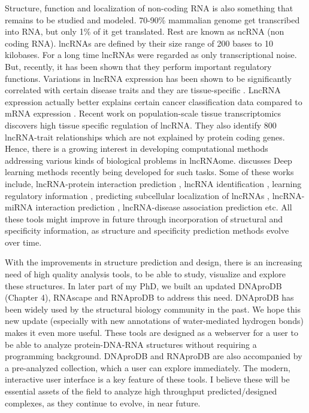 Structure, function and localization of non-coding RNA is also something that remains to be studied and modeled. 70-90\% mammalian genome get transcribed into RNA, but only 1\% of it get translated. Rest are known as ncRNA (non coding RNA). lncRNAs are defined by their size range of 200 bases to 10 kilobases. For a long time lncRNAs were regarded as only transcriptional noise. But, recently, it has been shown that they perform important regulatory functions. Variations in lncRNA expression has been shown to be significantly correlated with certain disease traits \citep{wapinski2011long} and they are tissue-specific \citep{seifuddin2020lncrnakb}. LncRNA expression actually better explains certain cancer
classification data compared to mRNA expression \citep{al2019long}. Recent work on population-scale tissue transcriptomics \citep{de2021population} discovers high tissue specific regulation of lncRNA. They also identify 800 lncRNA-trait relationships which are not explained by protein coding genes. Hence, there is a growing interest in developing computational methods addressing various kinds of biological problems in lncRNAome. \citep{alam2020deep} discusses Deep learning methods recently being developed for
such tasks. Some of these works include, lncRNA-protein interaction prediction
\citep{pan2016ipminer, zhao2018bipartite, yi2018deep, zhan2019bgfe, peng2019rpiter}, lncRNA  identification \citep{baek2018lncrnanet,yang2018lncadeep, tripathi2016deeplnc},
learning regulatory information \citep{alam2019deepcnpp, alam2019deepel}, predicting subcellular localization of lncRNAs \citep{gudenas2018prediction},    lncRNA-miRNA interaction prediction \citep{huang2019predicting}, lncRNA-disease association prediction \citep{hu2019deep, xuan2019dual, al2019long, xuan2019graph} etc. All these tools might improve in future through incorporation of structural and specificity information, as structure and specificity prediction methods evolve over time.

With the improvements in structure prediction and design, there is an increasing need of high quality analysis tools, to be able to study, visualize and explore these structures. In later part of my PhD, we built an updated DNAproDB (Chapter 4), RNAscape \citep{Mitra2024rnascape} and RNAproDB to address this need. DNAproDB \citep{Sagendorf2017, Sagendorf2020} has been widely used by the structural biology community in the past. We hope this new update (especially with new annotations of water-mediated hydrogen bonds) makes it even more useful. These tools are designed as a webserver for a user to be able to analyze protein-DNA-RNA structures without requiring a programming background. DNAproDB and RNAproDB are also accompanied by a pre-analyzed collection, which a user can explore immediately. The modern, interactive user interface is a key feature of these tools. I believe these will be essential assets of the field to analyze high throughput predicted/designed complexes, as they continue to evolve, in near future. 

